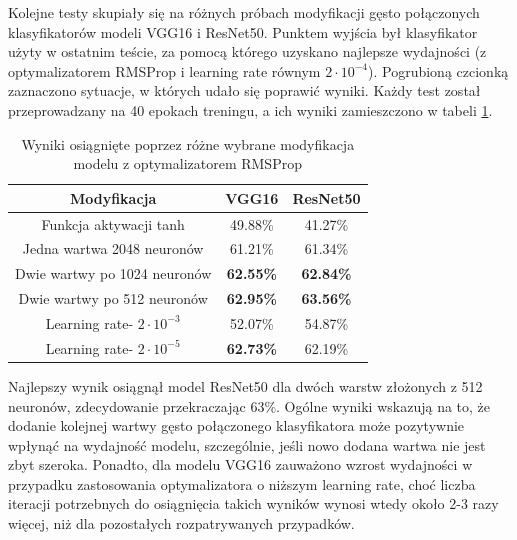 Kolejne testy skupiały się na różnych próbach modyfikacji gęsto połączonych klasyfikatorów modeli VGG16 i ResNet50. Punktem wyjścia był klasyfikator użyty w ostatnim teście, za pomocą którego uzyskano najlepsze wydajności (z optymalizatorem RMSProp i learning rate równym $2\cdot10^{-4}$). Pogrubioną czcionką zaznaczono sytuacje, w których udało się poprawić wyniki. Każdy test został przeprowadzany na 40 epokach treningu, a ich wyniki zamieszczono w tabeli \ref{tab:5.14}.

\begin{table}[H]
  \centering
  \caption{Wyniki osiągnięte poprzez różne wybrane modyfikacja modelu z optymalizatorem RMSProp}
    \begin{tabular}{ |c|c|c| }
    \hline
    Modyfikacja & VGG16 & ResNet50 \\
    \hline
    Funkcja aktywacji tanh & 49.88\% & 41.27\% \\ 
    Jedna wartwa 2048 neuronów & 61.21\% & 61.34\% \\ 
    Dwie wartwy po 1024 neuronów & \textbf{62.55\%} & \textbf{62.84\%} \\ 
    Dwie wartwy po 512 neuronów & \textbf{62.95\%} & \textbf{63.56\%} \\
    Learning rate- $2\cdot10^{-3}$ & 52.07\% & 54.87\% \\
    Learning rate- $2\cdot10^{-5}$ & \textbf{62.73\%} & 62.19\% \\
    \hline
    \end{tabular}
  \label{tab:5.14}
\end{table}

Najlepszy wynik osiągnął model ResNet50 dla dwóch warstw złożonych z 512 neuronów, zdecydowanie przekraczając 63\%. Ogólne wyniki wskazują na to, że dodanie kolejnej wartwy gęsto połączonego klasyfikatora może pozytywnie wpłynąć na wydajność modelu, szczególnie, jeśli nowo dodana wartwa nie jest zbyt szeroka. Ponadto, dla modelu VGG16 zauważono wzrost wydajności w przypadku zastosowania optymalizatora o niższym learning rate, choć liczba iteracji potrzebnych do osiągnięcia takich wyników wynosi wtedy około 2-3 razy więcej, niż dla pozostałych rozpatrywanych przypadków.

